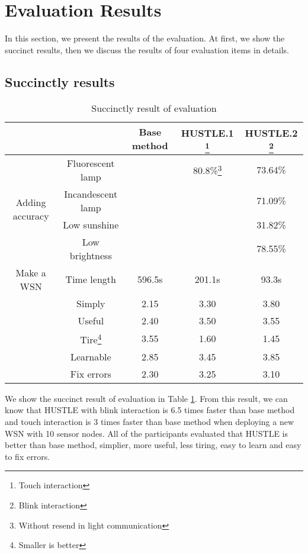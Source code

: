 \section{Evaluation Results}\label{sec:evaluation_result}
In this section, we present the results of the evaluation. At first, we show the succinct results, then we discuss the results of four evaluation items in details. 

\subsection{Succinctly results}
\begin{table}[htdp]
\caption{Succinctly result of evaluation}
\begin{center}
\begin{minipage}{0.9\linewidth}
\begin{tabular}{|c|c|c|c|c|}
\hline
&&Base method&HUSTLE.1 \footnote{Touch interaction} &HUSTLE.2 \footnote{Blink interaction} \\
\hline
\hline
\multirow{4}{*}{Adding accuracy}&Fluorescent lamp &&80.8\%\footnote{Without resend in light communication}&73.64\%\\
						&Incandescent lamp &&&71.09\%\\
						&Low sunshine&&&31.82\%\\
						&Low brightness&&&78.55\%\\
\hline		
\multirow{1}{*}{Make a WSN}&Time length&596.5s&201.1s&93.3s\\
					     &Simply&2.15&3.30&3.80\\
					     &Useful&2.40&3.50&3.55\\
					     &Tire\footnote{Smaller is better}&3.55&1.60&1.45\\
					     &Learnable&2.85&3.45&3.85\\
					     &Fix errors&2.30&3.25&3.10\\
\hline
\end{tabular}
\end{minipage}
\end{center}
\label{table:evaluation_succinct_result}
\end{table}%

We show the succinct result of evaluation in Table \ref{table:evaluation_succinct_result}. From this result, we can know that HUSTLE with blink interaction is 6.5 times faster than base method and touch interaction is 3 times faster than base method when deploying a new WSN with 10 sensor nodes. All of the participants evaluated that HUSTLE is better than base method, simplier, more useful, less tiring, easy to learn and easy to fix errors.

